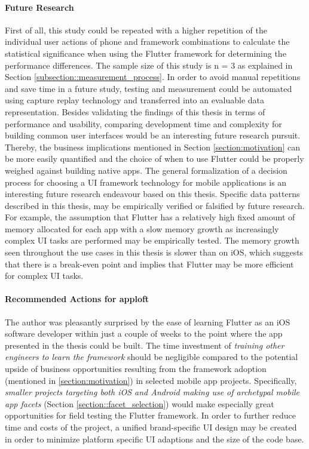 \paragraph*{Future Research}

First of all, this study could be repeated with a higher repetition of the individual user actions of phone and framework combinations
to calculate the statistical significance when using the Flutter framework for determining the performance differences.
The sample size of this study is n = 3 as explained in Section \ref{subsection::measurement_process}.
In order to avoid manual repetitions and save time in a future study, testing and measurement could be automated using
capture replay technology and transferred into an evaluable data representation.
Besides validating the findings of this thesis in terms of performance and usability, comparing development time and complexity for building common user interfaces
would be an interesting future research pursuit. Thereby, the business implications mentioned in Section \ref{section:motivation} can be more easily quantified and the choice of when to use Flutter 
could be properly weighed against building native apps.
The general formalization of a decision process for choosing a UI framework technology for mobile applications is an interesting future research endeavour based on this thesis.
Specific data patterns described in this thesis, may be empirically verified or falsified by future research.
For example, the assumption that Flutter has a relatively high fixed amount of memory allocated for each app with a slow memory growth as increasingly complex UI tasks are performed may be empirically tested.
The memory growth seen throughout the use cases in this thesis is slower than on iOS, which suggests that there is a break-even point and implies that Flutter may be more efficient for complex UI tasks.
\paragraph*{Recommended Actions for apploft}
The author was pleasantly surprised by the ease of learning Flutter as an iOS software developer within just a couple of weeks to the point where 
the app presented in the thesis could be built. The time investment of \emph{training other engineers to learn the framework} should be negligible compared to the potential upside of business opportunities
resulting from the framework adoption (mentioned in \ref{section:motivation}) in selected mobile app projects.
Specifically, \emph{smaller projects targeting both iOS and Android making use of archetypal mobile app facets} (Section \ref{section::facet_selection})
would make especially great opportunities for field testing the Flutter framework.
In order to further reduce time and costs of the project, a unified brand-specific UI design may be created in order to minimize platform specific
UI adaptions and the size of the code base.